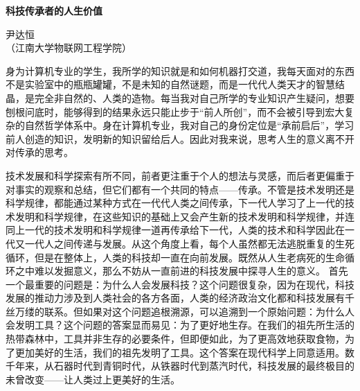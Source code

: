\documentclass[a4paper]{ctexart}
\begin{document}
\begin{center}
	{\textbf{科技传承者的人生价值}}

	{尹达恒}\\[-1mm]

	{（江南大学物联网工程学院）}
\end{center}
\begin{spacing}{1.3}
	身为计算机专业的学生，我所学的知识就是和如何机器打交道，我每天面对的东西不是实验室中的瓶瓶罐罐，不是未知的自然谜题，而是一代代人类天才的智慧结晶，是完全非自然的、人类的造物。每当我对自己所学的专业知识产生疑问，想要刨根问底时，能够得到的结果永远只能止步于“前人所创”，而不会被引导到宏大复杂的自然哲学体系中。身在计算机专业，我对自己的身份定位是“承前启后”，学习前人创造的知识，发明新的知识留给后人。因此对我来说，思考人生的意义离不开对传承的思考。

	技术发展和科学探索有所不同，前者更注重于个人的想法与灵感，而后者更偏重于对事实的观察和总结，但它们都有一个共同的特点——传承。不管是技术发明还是科学规律，都能通过某种方式在一代代人类之间传承，下一代人学习了上一代的技术发明和科学规律，在这些知识的基础上又会产生新的技术发明和科学规律，并连同上一代的技术发明和科学规律一道再传承给下一代，人类的技术和科学因此在一代又一代人之间传递与发展。从这个角度上看，每个人虽然都无法逃脱重复的生死循环，但是在整体上，人类的科技却一直在向前发展。既然从人生老病死的生命循环之中难以发掘意义，那么不妨从一直前进的科技发展中探寻人生的意义。
	首先一个最重要的问题是：为什么人会发展科技？这个问题很复杂，因为在现代，科技发展的推动力涉及到人类社会的各方各面，人类的经济政治文化都和科技发展有千丝万缕的联系。但如果对这个问题追根溯源，可以追溯到一个原始问题：为什么人会发明工具？这个问题的答案显而易见：为了更好地生存。在我们的祖先所生活的热带森林中，工具并非生存的必要条件，但即便如此，为了更高效地获取食物，为了更加美好的生活，我们的祖先发明了工具。这个答案在现代科学上同意适用。数千年来，从石器时代到青铜时代，从铁器时代到蒸汽时代，科技发展的最终极目的未曾改变——让人类过上更美好的生活。


\end{spacing}
\end{document}
